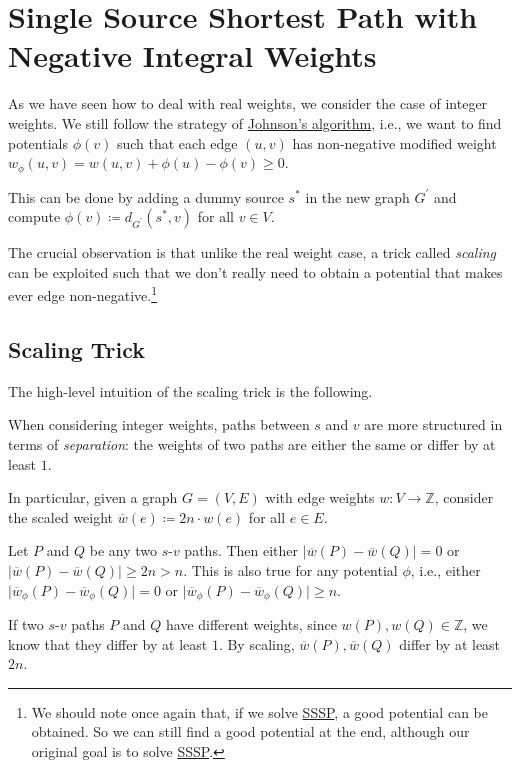 \section{Single Source Shortest Path with Negative Integral Weights}
As we have seen how to deal with real weights, we consider the case of integer weights. We still follow the strategy of \hyperref[prev:Johnson-algorithm]{Johnson's algorithm}, i.e., we want to find potentials \(\phi (v)\) such that each edge \((u, v)\) has non-negative modified weight \(w_{\phi }(u, v) = w(u, v) + \phi (u) - \phi (v) \geq 0\).

\begin{prev}
	This can be done by adding a dummy source \(s^{\ast} \) in the new graph \(G^{\prime} \) and compute \(\phi (v) \coloneqq d_{G^{\prime} }(s^{\ast} , v)\) for all \(v \in V\).
\end{prev}

The crucial observation is that unlike the real weight case, a trick called \emph{scaling} can be exploited such that we don't really need to obtain a potential that makes ever edge non-negative.\footnote{We should note once again that, if we solve \hyperref[prb:SSSP]{SSSP}, a good potential can be obtained. So we can still find a good potential at the end, although our original goal is to solve \hyperref[prb:SSSP]{SSSP}.}

\subsection{Scaling Trick}
The high-level intuition of the scaling trick is the following.

\begin{intuition}[Scaling]
	When considering integer weights, paths between \(s\) and \(v\) are more structured in terms of \emph{separation}: the weights of two paths are either the same or differ by at least \(1\).
\end{intuition}

In particular, given a graph \(G = (V, E)\) with edge weights \(w \colon V \to \mathbb{Z} \), consider the scaled weight \(\overline{w} (e) \coloneqq 2n \cdot w(e)\) for all \(e \in E\).

\begin{claim}
	Let \(P\) and \(Q\) be any two \(s\)-\(v\) paths. Then either \(\lvert \overline{w} (P) - \overline{w} (Q) \rvert = 0\) or \(\lvert \overline{w} (P) - \overline{w} (Q) \rvert \geq 2n > n\). This is also true for any potential \(\phi \), i.e., either \(\lvert \overline{w} _\phi (P) - \overline{w} _\phi (Q) \rvert = 0\) or \(\lvert \overline{w} _\phi (P) - \overline{w} _\phi (Q) \rvert \geq n\).
\end{claim}
\begin{explanation}
	If two \(s\)-\(v\) paths \(P\) and \(Q\) have different weights, since \(w(P) , w(Q) \in \mathbb{Z} \), we know that they differ by at least \(1\). By scaling, \(\overline{w} (P), \overline{w} (Q)\) differ by at least \(2n\).
\end{explanation}

